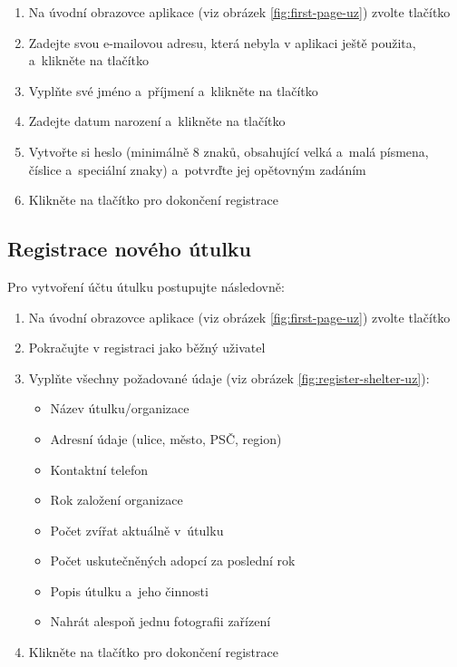 \documentclass[czech, bp, kiv, he, iso690numb, pdf]{fasthesis}
\begin{document}
    \begin{enumerate}
        \item Na úvodní obrazovce aplikace (viz obrázek \ref{fig:first-page-uz}) zvolte tlačítko\\ 
        \item Zadejte svou e-mailovou adresu, která nebyla v aplikaci ještě použita, a~klikněte na tlačítko 
        \item Vyplňte své jméno a~příjmení a~klikněte na tlačítko 
        \item Zadejte datum narození a~klikněte na tlačítko 
        \item Vytvořte si heslo (minimálně 8 znaků, obsahující velká a~malá písmena, číslice a~speciální znaky) a~potvrďte jej opětovným zadáním
        \item Klikněte na tlačítko  pro dokončení registrace
    \end{enumerate}

    \subsection*{Registrace nového útulku}

    Pro vytvoření účtu útulku postupujte následovně:

    \begin{enumerate}
        \item Na úvodní obrazovce aplikace (viz obrázek \ref{fig:first-page-uz}) zvolte tlačítko\\ 
        \item Pokračujte v registraci jako běžný uživatel

        \item Vyplňte všechny požadované údaje (viz obrázek \ref{fig:register-shelter-uz}):
        \begin{itemize}
            \item Název útulku/organizace
            \item Adresní údaje (ulice, město, PSČ, region)
            \item Kontaktní telefon
            \item Rok založení organizace
            \item Počet zvířat aktuálně v~útulku
            \item Počet uskutečněných adopcí za poslední rok
            \item Popis útulku a~jeho činnosti
            \item Nahrát alespoň jednu fotografii zařízení
        \end{itemize}
        \item Klikněte na tlačítko  pro dokončení registrace
    \end{enumerate}
\end{document}

